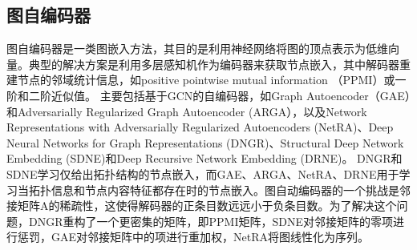 \subsection{图自编码器}
图自编码器是一类图嵌入方法，其目的是利用神经网络将图的顶点表示为低维向量。典型的解决方案是利用多层感知机作为编码器来获取节点嵌入，其中解码器重建节点的邻域统计信息，如positive pointwise mutual information （PPMI）或一阶和二阶近似值。
主要包括基于GCN的自编码器，如Graph Autoencoder（GAE）\cite{kipf2016variational}和Adversarially Regularized Graph Autoencoder (ARGA）\cite{pan2018adversarially}，以及Network Representations with Adversarially Regularized Autoencoders (NetRA)\cite{yu2018learning}、Deep Neural Networks for Graph Representations (DNGR)\cite{cao2016deep}、Structural Deep Network Embedding (SDNE)\cite{wang2016structural}和Deep Recursive Network Embedding (DRNE)\cite{tu2018deep}。
DNGR和SDNE学习仅给出拓扑结构的节点嵌入，而GAE、ARGA、NetRA、DRNE用于学习当拓扑信息和节点内容特征都存在时的节点嵌入。图自动编码器的一个挑战是邻接矩阵A的稀疏性，这使得解码器的正条目数远远小于负条目数。为了解决这个问题，DNGR重构了一个更密集的矩阵，即PPMI矩阵，SDNE对邻接矩阵的零项进行惩罚，GAE对邻接矩阵中的项进行重加权，NetRA将图线性化为序列。
